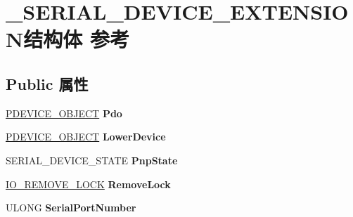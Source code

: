 \hypertarget{struct___s_e_r_i_a_l___d_e_v_i_c_e___e_x_t_e_n_s_i_o_n}{}\section{\+\_\+\+S\+E\+R\+I\+A\+L\+\_\+\+D\+E\+V\+I\+C\+E\+\_\+\+E\+X\+T\+E\+N\+S\+I\+O\+N结构体 参考}
\label{struct___s_e_r_i_a_l___d_e_v_i_c_e___e_x_t_e_n_s_i_o_n}
\subsection*{Public 属性}
\begin{DoxyCompactItemize}
\item 
\mbox{\label{struct___s_e_r_i_a_l___d_e_v_i_c_e___e_x_t_e_n_s_i_o_n_ae63949f4a70763468239edd5c0919af5}} 
\hyperlink{struct___d_e_v_i_c_e___o_b_j_e_c_t}{P\+D\+E\+V\+I\+C\+E\+\_\+\+O\+B\+J\+E\+CT} {\bfseries Pdo}
\item 
\mbox{\label{struct___s_e_r_i_a_l___d_e_v_i_c_e___e_x_t_e_n_s_i_o_n_a042a76211de13ddd4027c1520c80067a}} 
\hyperlink{struct___d_e_v_i_c_e___o_b_j_e_c_t}{P\+D\+E\+V\+I\+C\+E\+\_\+\+O\+B\+J\+E\+CT} {\bfseries Lower\+Device}
\item 
\mbox{\label{struct___s_e_r_i_a_l___d_e_v_i_c_e___e_x_t_e_n_s_i_o_n_abbdb647f4fde668dc25630e5fae1dea2}} 
S\+E\+R\+I\+A\+L\+\_\+\+D\+E\+V\+I\+C\+E\+\_\+\+S\+T\+A\+TE {\bfseries Pnp\+State}
\item 
\mbox{\label{struct___s_e_r_i_a_l___d_e_v_i_c_e___e_x_t_e_n_s_i_o_n_a4f219411ce9955107da16a094f08a0fa}} 
\hyperlink{struct___i_o___r_e_m_o_v_e___l_o_c_k}{I\+O\+\_\+\+R\+E\+M\+O\+V\+E\+\_\+\+L\+O\+CK} {\bfseries Remove\+Lock}
\item 
\mbox{\label{struct___s_e_r_i_a_l___d_e_v_i_c_e___e_x_t_e_n_s_i_o_n_a33a2bce2e2ea91a50647a22f0cf496eb}} 
U\+L\+O\+NG {\bfseries Serial\+Port\+Number}
\item 

\end{DoxyCompactItemize}
